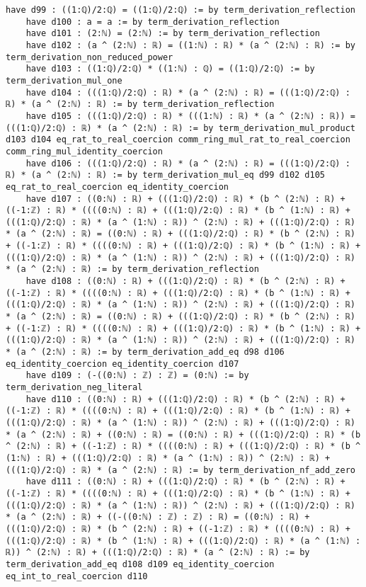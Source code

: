 \documentclass{article}
\begin{document}
\begin{tcolorbox}[colback=white!10, width=\linewidth]
\begin{lstlisting}[language=Lean4]
    have d99 : ((1:ℚ)/2:ℚ) = ((1:ℚ)/2:ℚ) := by term_derivation_reflection
    have d100 : a = a := by term_derivation_reflection
    have d101 : (2:ℕ) = (2:ℕ) := by term_derivation_reflection
    have d102 : (a ^ (2:ℕ) : ℝ) = ((1:ℕ) : ℝ) * (a ^ (2:ℕ) : ℝ) := by term_derivation_non_reduced_power
    have d103 : ((1:ℚ)/2:ℚ) * ((1:ℕ) : ℚ) = ((1:ℚ)/2:ℚ) := by term_derivation_mul_one
    have d104 : (((1:ℚ)/2:ℚ) : ℝ) * (a ^ (2:ℕ) : ℝ) = (((1:ℚ)/2:ℚ) : ℝ) * (a ^ (2:ℕ) : ℝ) := by term_derivation_reflection
    have d105 : (((1:ℚ)/2:ℚ) : ℝ) * (((1:ℕ) : ℝ) * (a ^ (2:ℕ) : ℝ)) = (((1:ℚ)/2:ℚ) : ℝ) * (a ^ (2:ℕ) : ℝ) := by term_derivation_mul_product d103 d104 eq_rat_to_real_coercion comm_ring_mul_rat_to_real_coercion comm_ring_mul_identity_coercion
    have d106 : (((1:ℚ)/2:ℚ) : ℝ) * (a ^ (2:ℕ) : ℝ) = (((1:ℚ)/2:ℚ) : ℝ) * (a ^ (2:ℕ) : ℝ) := by term_derivation_mul_eq d99 d102 d105 eq_rat_to_real_coercion eq_identity_coercion
    have d107 : ((0:ℕ) : ℝ) + (((1:ℚ)/2:ℚ) : ℝ) * (b ^ (2:ℕ) : ℝ) + ((-1:ℤ) : ℝ) * ((((0:ℕ) : ℝ) + (((1:ℚ)/2:ℚ) : ℝ) * (b ^ (1:ℕ) : ℝ) + (((1:ℚ)/2:ℚ) : ℝ) * (a ^ (1:ℕ) : ℝ)) ^ (2:ℕ) : ℝ) + (((1:ℚ)/2:ℚ) : ℝ) * (a ^ (2:ℕ) : ℝ) = ((0:ℕ) : ℝ) + (((1:ℚ)/2:ℚ) : ℝ) * (b ^ (2:ℕ) : ℝ) + ((-1:ℤ) : ℝ) * ((((0:ℕ) : ℝ) + (((1:ℚ)/2:ℚ) : ℝ) * (b ^ (1:ℕ) : ℝ) + (((1:ℚ)/2:ℚ) : ℝ) * (a ^ (1:ℕ) : ℝ)) ^ (2:ℕ) : ℝ) + (((1:ℚ)/2:ℚ) : ℝ) * (a ^ (2:ℕ) : ℝ) := by term_derivation_reflection
    have d108 : ((0:ℕ) : ℝ) + (((1:ℚ)/2:ℚ) : ℝ) * (b ^ (2:ℕ) : ℝ) + ((-1:ℤ) : ℝ) * ((((0:ℕ) : ℝ) + (((1:ℚ)/2:ℚ) : ℝ) * (b ^ (1:ℕ) : ℝ) + (((1:ℚ)/2:ℚ) : ℝ) * (a ^ (1:ℕ) : ℝ)) ^ (2:ℕ) : ℝ) + (((1:ℚ)/2:ℚ) : ℝ) * (a ^ (2:ℕ) : ℝ) = ((0:ℕ) : ℝ) + (((1:ℚ)/2:ℚ) : ℝ) * (b ^ (2:ℕ) : ℝ) + ((-1:ℤ) : ℝ) * ((((0:ℕ) : ℝ) + (((1:ℚ)/2:ℚ) : ℝ) * (b ^ (1:ℕ) : ℝ) + (((1:ℚ)/2:ℚ) : ℝ) * (a ^ (1:ℕ) : ℝ)) ^ (2:ℕ) : ℝ) + (((1:ℚ)/2:ℚ) : ℝ) * (a ^ (2:ℕ) : ℝ) := by term_derivation_add_eq d98 d106 eq_identity_coercion eq_identity_coercion d107
    have d109 : (-((0:ℕ) : ℤ) : ℤ) = (0:ℕ) := by term_derivation_neg_literal
    have d110 : ((0:ℕ) : ℝ) + (((1:ℚ)/2:ℚ) : ℝ) * (b ^ (2:ℕ) : ℝ) + ((-1:ℤ) : ℝ) * ((((0:ℕ) : ℝ) + (((1:ℚ)/2:ℚ) : ℝ) * (b ^ (1:ℕ) : ℝ) + (((1:ℚ)/2:ℚ) : ℝ) * (a ^ (1:ℕ) : ℝ)) ^ (2:ℕ) : ℝ) + (((1:ℚ)/2:ℚ) : ℝ) * (a ^ (2:ℕ) : ℝ) + ((0:ℕ) : ℝ) = ((0:ℕ) : ℝ) + (((1:ℚ)/2:ℚ) : ℝ) * (b ^ (2:ℕ) : ℝ) + ((-1:ℤ) : ℝ) * ((((0:ℕ) : ℝ) + (((1:ℚ)/2:ℚ) : ℝ) * (b ^ (1:ℕ) : ℝ) + (((1:ℚ)/2:ℚ) : ℝ) * (a ^ (1:ℕ) : ℝ)) ^ (2:ℕ) : ℝ) + (((1:ℚ)/2:ℚ) : ℝ) * (a ^ (2:ℕ) : ℝ) := by term_derivation_nf_add_zero
    have d111 : ((0:ℕ) : ℝ) + (((1:ℚ)/2:ℚ) : ℝ) * (b ^ (2:ℕ) : ℝ) + ((-1:ℤ) : ℝ) * ((((0:ℕ) : ℝ) + (((1:ℚ)/2:ℚ) : ℝ) * (b ^ (1:ℕ) : ℝ) + (((1:ℚ)/2:ℚ) : ℝ) * (a ^ (1:ℕ) : ℝ)) ^ (2:ℕ) : ℝ) + (((1:ℚ)/2:ℚ) : ℝ) * (a ^ (2:ℕ) : ℝ) + ((-((0:ℕ) : ℤ) : ℤ) : ℝ) = ((0:ℕ) : ℝ) + (((1:ℚ)/2:ℚ) : ℝ) * (b ^ (2:ℕ) : ℝ) + ((-1:ℤ) : ℝ) * ((((0:ℕ) : ℝ) + (((1:ℚ)/2:ℚ) : ℝ) * (b ^ (1:ℕ) : ℝ) + (((1:ℚ)/2:ℚ) : ℝ) * (a ^ (1:ℕ) : ℝ)) ^ (2:ℕ) : ℝ) + (((1:ℚ)/2:ℚ) : ℝ) * (a ^ (2:ℕ) : ℝ) := by term_derivation_add_eq d108 d109 eq_identity_coercion eq_int_to_real_coercion d110

\end{lstlisting}
\end{tcolorbox}
\end{document}
